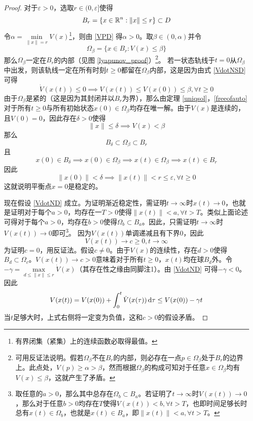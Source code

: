 \begin{proof}
  对于$\varepsilon>0$，选取$r\in (0,\varepsilon]$使得\[B_r=\{x\in\mathbb{R}{}^n:\|x\|\le r\}\subset D\]
  令$\alpha=\min\limits_{\|x\|=r}V(x)$\footnote{有界闭集（紧集）上的连续函数必取得最值。}，则由 \eqref{VPD} 得$\alpha>0$。取$\beta\in(0,\alpha)$并令\[\Omega_\beta=\{x\in B_r:V(x)\le \beta\}\]
  那么$\Omega_\beta$一定在$B_r$的内部（见图 \ref{lyapunov_proof}）\footnote{可用反证法说明。假若$\Omega_\beta$不在$B_r$的内部，则必存在一点$p\in\Omega_\beta$处于$B_r$的边界上。此点处，$V(p)\ge\alpha>\beta$，然而根据$\Omega_\beta$的构成可知对于任意$x\in\Omega_\beta$均有$V(x)\le\beta$，这就产生了矛盾。}。
  若一状态轨线于$t=0$从$\Omega_\beta$中出发，则该轨线一定在所有时刻$t\ge 0$都留在$\Omega_\beta$内部，这是因为由式 \eqref{VdotNSD} 可得
  \[\dot{V}(x(t))\le 0\implies V(x(t))\le V(x(0))\le \beta,\forall t\ge 0\]
  由于$\Omega_\beta$是紧的（这是因为其封闭并以$B_r$为界），那么由定理 \ref{uniqsol}，\eqref{freeofauto} 对于所有$t\ge 0$与所有初始状态$x(0)\in\Omega_\beta$均存在唯一解。由于$V(x)$是连续的，且$V(0)=0$，因此存在$\delta>0$使得\[\|x\|\le\delta\implies V(x)<\beta\]
  那么\[B_\delta\subset\Omega_\beta\subset B_r\]且\[x(0)\in B_\delta\implies x(0)\in\Omega_\beta\implies x(t)\in\Omega_\beta\implies x(t)\in B_r\]
  因此\[\|x(0)\|<\delta\implies \|x(t)\|<r\le\varepsilon,\forall t\ge 0\]
  这就说明平衡点$x=0$是稳定的。

  现在假设 \eqref{VdotND} 成立。为证明渐近稳定性，需证明$t\to\infty$时$x(t)\to 0$，也就是证明对于每个$a>0$，均存在一$T>0$使得$\|x(t)\|<a,\forall t>T$。类似上面论述可得对于每个$a>0$，均存在$b>0$使得$\Omega_b\subset B_a$。因此，只需证明$t\to\infty$时$V(x(t))\to 0$即可\footnote{取任意的$a>0$，那么其中总存在$\Omega_b\subset B_a$。若证明了$t\to\infty$时$V(x(t))\to 0$，那么对于任意$b>0$均存在$T$使得$V(x(t))<b,\forall t>T$，也即时间足够长时总有$x(t)\in\Omega_b$，也就是$x(t)\in B_a$，即$\|x(t)\|<a,\forall t>T$。}。
  因为$V(x(t))$单调递减且有下界$0$，因此\[V(x(t))\to c\ge 0,t\to\infty\]
  为证明$c=0$，用反证法。假设$c\ne 0$。由于$V(x)$的连续性，存在$d>0$使得$B_d\subset\Omega_c$。$V(x(t))\to c> 0$意味着对于所有$t\ge 0$，$x(t)$均在球$B_d$外。令$-\gamma=\max\limits_{d\le\|x\|\le r}\dot{V}(x)$（其存在性之缘由同脚注1）。由 \eqref{VdotND} 可得$-\gamma<0$。因此\[V(x(t))=V(x(0))+\int_{0}^{t}\dot{V}(x(\tau))\mathop{}\!\mathrm{d}\tau\le V(x(0))-\gamma t\]
  当$t$足够大时，上式右侧将一定变为负值，这和$c>0$的假设矛盾。
\end{proof}

